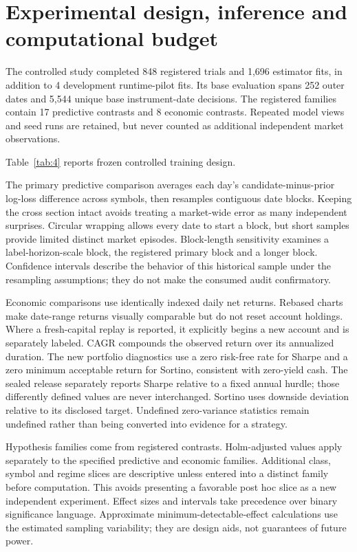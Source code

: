 \section{Experimental design, inference and computational budget}\label{sec:section-05}

The controlled study completed 848 registered trials and 1,696 estimator fits, in addition to 4 development runtime-pilot fits. Its base evaluation spans 252 outer dates and 5,544 unique base instrument-date decisions. The registered families contain 17 predictive contrasts and 8 economic contrasts. Repeated model views and seed runs are retained, but never counted as additional independent market observations.

\noindent Table~\ref{tab:4} reports frozen controlled training design.



The primary predictive comparison averages each day's candidate-minus-prior log-loss difference across symbols, then resamples contiguous date blocks. Keeping the cross section intact avoids treating a market-wide error as many independent surprises. Circular wrapping allows every date to start a block, but short samples provide limited distinct market episodes. Block-length sensitivity examines a label-horizon-scale block, the registered primary block and a longer block. Confidence intervals describe the behavior of this historical sample under the resampling assumptions; they do not make the consumed audit confirmatory.

Economic comparisons use identically indexed daily net returns. Rebased charts make date-range returns visually comparable but do not reset account holdings. Where a fresh-capital replay is reported, it explicitly begins a new account and is separately labeled. CAGR compounds the observed return over its annualized duration. The new portfolio diagnostics use a zero risk-free rate for Sharpe and a zero minimum acceptable return for Sortino, consistent with zero-yield cash. The sealed release separately reports Sharpe relative to a fixed annual hurdle; those differently defined values are never interchanged. Sortino uses downside deviation relative to its disclosed target. Undefined zero-variance statistics remain undefined rather than being converted into evidence for a strategy.

Hypothesis families come from registered contrasts. Holm-adjusted values apply separately to the specified predictive and economic families. Additional class, symbol and regime slices are descriptive unless entered into a distinct family before computation. This avoids presenting a favorable post hoc slice as a new independent experiment. Effect sizes and intervals take precedence over binary significance language. Approximate minimum-detectable-effect calculations use the estimated sampling variability; they are design aids, not guarantees of future power.

